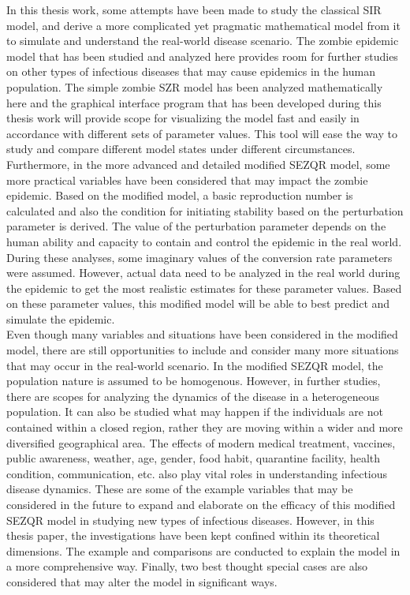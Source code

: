 In this thesis work, some attempts have been made to study the classical SIR model, and derive a more complicated yet pragmatic mathematical model from it to simulate and understand the real-world disease scenario. The zombie epidemic model that has been studied and analyzed here provides room for further studies on other types of infectious diseases that may cause epidemics in the human population. The simple zombie SZR model has been analyzed mathematically here and the graphical interface program that has been developed during this thesis work will provide scope for visualizing the model fast and easily in accordance with different sets of parameter values. This tool will ease the way to study and compare different model states under different circumstances. \\

Furthermore, in the more advanced and detailed modified SEZQR model, some more practical variables have been considered that may impact the zombie epidemic. Based on the modified model, a basic reproduction number is calculated and also the condition for initiating stability based on the perturbation parameter is derived. The value of the perturbation parameter depends on the human ability and capacity to contain and control the epidemic in the real world. During these analyses, some imaginary values of the conversion rate parameters were assumed. However, actual data need to be analyzed in the real world during the epidemic to get the most realistic estimates for these parameter values. Based on these parameter values, this modified model will be able to best predict and simulate the epidemic. \\

Even though many variables and situations have been considered in the modified model, there are still opportunities to include and consider many more situations that may occur in the real-world scenario. In the modified SEZQR model, the population nature is assumed to be homogenous. However, in further studies, there are scopes for analyzing the dynamics of the disease in a heterogeneous population. It can also be studied what may happen if the individuals are not contained within a closed region, rather they are moving within a wider and more diversified geographical area. The effects of modern medical treatment, vaccines, public awareness, weather, age, gender, food habit, quarantine facility, health condition, communication, etc. also play vital roles in understanding infectious disease dynamics. These are some of the example variables that may be considered in the future to expand and elaborate on the efficacy of this modified SEZQR model in studying new types of infectious diseases. However, in this thesis paper, the investigations have been kept confined within its theoretical dimensions. The example and comparisons are conducted to explain the model in a more comprehensive way. Finally, two best thought special cases are also considered that may alter the model in significant ways.
